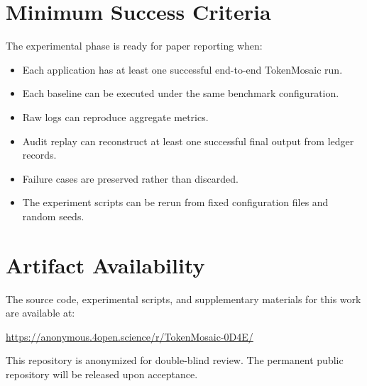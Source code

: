 \documentclass{article}
\theoremstyle{plain}
\begin{document}
\section{Minimum Success Criteria}

The experimental phase is ready for paper reporting when:
\begin{itemize}[leftmargin=*]
  \item Each application has at least one successful end-to-end TokenMosaic run.
  \item Each baseline can be executed under the same benchmark configuration.
  \item Raw logs can reproduce aggregate metrics.
  \item Audit replay can reconstruct at least one successful final output from ledger records.
  \item Failure cases are preserved rather than discarded.
  \item The experiment scripts can be rerun from fixed configuration files and random seeds.
\end{itemize}

\section{Artifact Availability}
\label{app:artifact}

The source code, experimental scripts, and supplementary materials for this work are available at:

\begin{center}
\url{https://anonymous.4open.science/r/TokenMosaic-0D4E/}
\end{center}

This repository is anonymized for double-blind review. The permanent public repository will be released upon acceptance.
\end{document}
